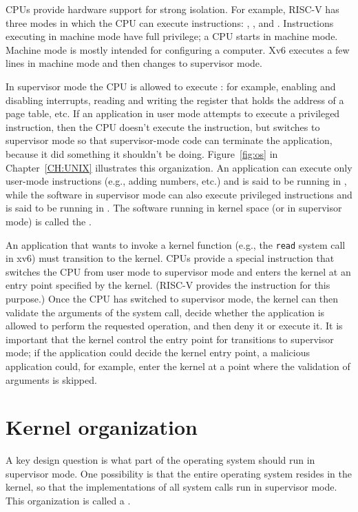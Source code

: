 CPUs provide hardware support for strong isolation.   For
example, RISC-V has three modes in which
the CPU can execute instructions:
,
, and
.
Instructions executing in machine mode have full privilege; a
CPU starts in machine mode.  Machine mode is mostly intended for
configuring a computer.  Xv6 executes a few lines in machine mode and
then changes to supervisor mode.

In supervisor mode the CPU is allowed to execute 
:
for example, enabling and disabling interrupts,  reading and writing
the register that holds the address of a page table, etc.
If an application in user mode attempts to execute
a privileged instruction, then the CPU doesn't execute the instruction, but switches
to supervisor mode so that supervisor-mode code can terminate the application,
because it did something it shouldn't be doing. 
Figure~\ref{fig:os}
in Chapter~\ref{CH:UNIX} illustrates this organization.  An application can
execute only user-mode instructions (e.g., adding numbers, etc.) and is said to
be running in 
,
while the software in supervisor mode can also execute privileged instructions and
is said to be running in
.
The software running in kernel space (or in supervisor mode) is called
the
.

An application that wants to invoke a kernel function (e.g., the
\lstinline{read}
system call in xv6) must 
transition to the kernel.  CPUs provide a special instruction that switches the
CPU from user mode to supervisor mode and enters the kernel at an entry point
specified by the kernel.  (RISC-V
provides the 
instruction for this purpose.)  Once the CPU has switched to supervisor mode,
the kernel can then validate the arguments of the system call, decide whether
the application is allowed to perform the requested operation, and then deny it
or execute it.  It is important that the kernel control the entry point for
transitions to supervisor mode; if the application could decide the kernel entry
point, a malicious application could, for example, enter the kernel at a point where the
validation of arguments is skipped.
\section{Kernel organization}

A key design question is what part of the operating
system should run in supervisor mode. 
One possibility is that the entire operating system resides
in the kernel, so that the implementations of all system calls
run in supervisor mode.
This organization is called a
.

